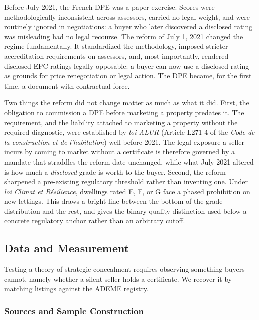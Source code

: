 Before July 2021, the French DPE was a paper exercise. Scores were methodologically inconsistent across assessors, carried no legal weight, and were routinely ignored in negotiations: a buyer who later discovered a disclosed rating was misleading had no legal recourse. The reform of July 1, 2021 changed the regime fundamentally. It standardized the methodology, imposed stricter accreditation requirements on assessors, and, most importantly, rendered disclosed EPC ratings legally opposable: a buyer can now use a disclosed rating as grounds for price renegotiation or legal action. The DPE became, for the first time, a document with contractual force.

Two things the reform did not change matter as much as what it did. First, the obligation to
commission a DPE before marketing a property predates it. The requirement, and the liability
attached to marketing a property without the required diagnostic, were established by \emph{loi
ALUR} (Article L271-4 of the \emph{Code de la construction et de l'habitation}) well before 2021.
The legal exposure a seller incurs by coming to market without a certificate is therefore governed
by a mandate that straddles the reform date unchanged, while what July 2021 altered is how much a
\emph{disclosed} grade is worth to the buyer. Second, the reform sharpened a pre-existing
regulatory threshold rather than inventing one. Under \emph{loi Climat et R\'esilience}, dwellings
rated E, F, or G face a phased prohibition on new lettings. This draws a bright line between the
bottom of the grade distribution and the rest, and gives the binary quality distinction used below
a concrete regulatory anchor rather than an arbitrary cutoff.

\subsection{Data and Measurement}
\label{sec:data}

Testing a theory of strategic concealment requires observing something buyers cannot, namely whether
a silent seller holds a certificate. We recover it by matching listings against the ADEME registry.

\subsubsection{Sources and Sample Construction}

